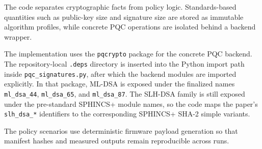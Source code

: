 The code separates cryptographic facts from policy logic. Standards-based quantities such as public-key size and signature size are stored as immutable algorithm profiles, while concrete PQC operations are isolated behind a backend wrapper.

The implementation uses the \texttt{pqcrypto} package for the concrete PQC backend. The repository-local \texttt{.deps} directory is inserted into the Python import path inside \texttt{pqc\_signatures.py}, after which the backend modules are imported explicitly. In that package, ML-DSA is exposed under the finalized names \texttt{ml\_dsa\_44}, \texttt{ml\_dsa\_65}, and \texttt{ml\_dsa\_87}. The SLH-DSA family is still exposed under the pre-standard SPHINCS+ module names, so the code maps the paper's \texttt{slh\_dsa\_*} identifiers to the corresponding SPHINCS+ SHA-2 simple variants.

The policy scenarios use deterministic firmware payload generation so that manifest hashes and measured outputs remain reproducible across runs.
